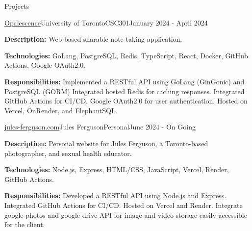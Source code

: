 \documentclass[11pt]{resume} %
\begin{document}

\begin{rSection}{Projects}

	\begin{rSubsection}{\href{https://github.com/opalescencelabs}{Opalescence}}{University of Toronto}{CSC301}{January 2024 - April 2024}
		\item	\textbf{Description:} Web-based sharable note-taking application.
		\item	\textbf{Technologies:} GoLang, PostgreSQL, Redis, TypeScript, React, Docker, GitHub Actions, Google OAuth2.0.
		\item	\textbf{Responsibilities:} Implemented a RESTful API using GoLang (GinGonic) and PostgreSQL (GORM) Integrated hosted Redis for caching responses. Integrated GitHub Actions for CI/CD. Google OAuth2.0 for user authentication. Hosted on Vercel, OnRender, and ElephantSQL.
	\end{rSubsection}

	\begin{rSubsection}{\href{https://jules-ferguson.com}{jules-ferguson.com}}{Jules Ferguson}{Personal}{June 2024 - On Going}
		\item	\textbf{Description:} Personal website for Jules Ferguson, a Toronto-based photographer, and sexual health educator.
		\item	\textbf{Technologies:} Node.js, Express, HTML/CSS, JavaScript, Vercel, Render, GitHub Actions.
		\item	\textbf{Responsibilities:} Developed a RESTful API using Node.js and Express. Integrated GitHub Actions for CI/CD. Hosted on Vercel and Render. Integrate google photos and google drive API for image and video storage easily accessible for the client.
	\end{rSubsection}

\end{rSection}

\newpage

\end{document}
